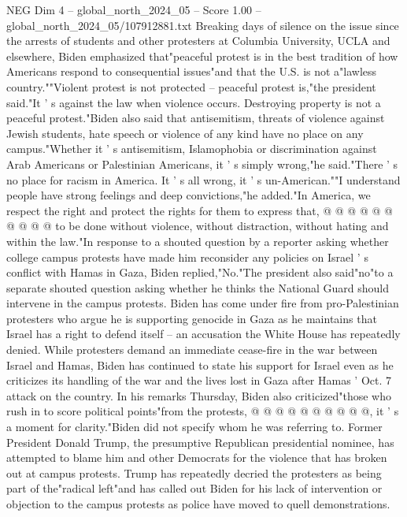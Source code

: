 \begin{textsample}{NEG Dim 4 – global\_north\_2024\_05 – Score 1.00 – global\_north\_2024\_05/107912881.txt}  \label{ex:f4_neg_126}
Breaking days of silence on the issue since the arrests of students and other protesters at Columbia University, UCLA and elsewhere, Biden emphasized that"peaceful protest is in the best tradition of how Americans respond to consequential issues"and that the U.S. is not a"lawless country.""Violent protest is not protected -- peaceful protest is,"the president said."It ' s against the law when violence occurs.
Destroying property is not a peaceful protest."Biden also said that antisemitism, threats of violence against Jewish students, hate speech or violence of any kind have no place on any campus."Whether it ' s antisemitism, Islamophobia or discrimination against Arab Americans or Palestinian Americans, it ' s simply wrong,"he said."There ' s no place for racism in America.
It ' s all wrong, it ' s un-American.""I understand people have strong feelings and deep convictions,"he added."In America, we respect the right and protect the rights for them to express that, @ @ @ @ @ @ @ @ @ @ to be done without violence, without distraction, without hating and within the law."In response to a shouted question by a reporter asking whether college campus protests have made him reconsider any policies on Israel ' s conflict with Hamas in Gaza, Biden replied,"No."The president also said"no"to a separate shouted question asking whether he thinks the National Guard should intervene in the campus protests.
Biden has come under fire from pro-Palestinian protesters who argue he is supporting genocide in Gaza as he maintains that Israel has a right to defend itself -- an accusation the White House has repeatedly denied.
While protesters demand an immediate cease-fire in the war between Israel and Hamas, Biden has continued to state his support for Israel even as he criticizes its handling of the war and the lives lost in Gaza after Hamas ' Oct. 7 attack on the country.
In his remarks Thursday, Biden also criticized"those who rush in to score political points"from the protests, @ @ @ @ @ @ @ @ @ @, it ' s a moment for clarity."Biden did not specify whom he was referring to.
Former President Donald Trump, the presumptive Republican presidential nominee, has attempted to blame him and other Democrats for the violence that has broken out at campus protests.
Trump has repeatedly decried the protesters as being part of the"radical left"and has called out Biden for his lack of intervention or objection to the campus protests as police have moved to quell demonstrations.

\end{textsample}
